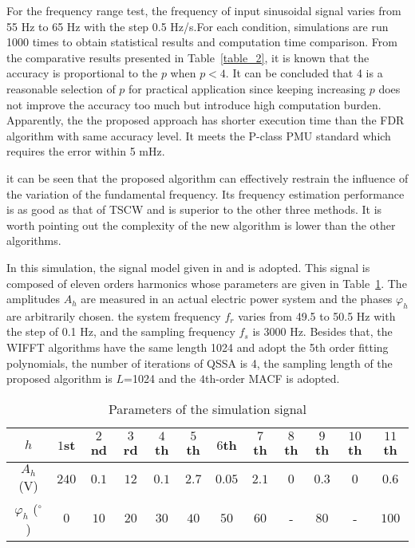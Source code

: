 \documentclass[journal,twoside]{IEEEtran}
\begin{document}
For the frequency range test, the  frequency of  input sinusoidal signal  varies from 55 Hz to 65 Hz with the step 0.5 Hz/s.For each condition, simulations are run 1000 times to obtain statistical results and computation time comparison.      
From the comparative results presented in Table~\ref{table_2},  it is known that the accuracy is proportional to the $p$ when $p<4$. It can be concluded that 4 is a reasonable selection of $p$ for practical application since keeping increasing $p$ does not improve the accuracy too much but introduce high computation burden. 
Apparently, the the proposed approach has shorter execution time than the FDR algorithm with same accuracy level. It meets the P-class PMU standard  which requires the error within 5 mHz.




it can be seen that the proposed algorithm can effectively restrain the influence of the variation of the fundamental frequency. Its frequency estimation performance is as good as that of TSCW and is superior to the other three methods. It is worth pointing out the complexity of the new algorithm is lower than the other algorithms.









In this simulation, the signal model given in \cite{Wen2014} and \cite{Zhang2001} is adopted. This signal is composed of eleven orders harmonics whose parameters are given in Table~\ref{table_1}. The amplitudes $A_h$ are measured in an actual electric power system and the phases $\varphi_h$ are arbitrarily chosen.  the system frequency $f_r$ varies from 49.5 to 50.5 Hz with the step of 0.1 Hz, and the sampling frequency $f_s$ is 3000 Hz. Besides that, the WIFFT algorithms have the same length 1024 and adopt the 5th order fitting polynomials, the number of iterations of QSSA is 4, the sampling length of the proposed algorithm is $L$=1024 and the $4$th-order MACF is adopted.

\begin{table}
	\renewcommand{\arraystretch}{1.3}
	\caption{Parameters of the simulation signal}
	\label{table_1}
	\centering
	\begin{tabular}{@{ }c@{ }@{ }c@{ }@{ }c@{ }@{ }c@{ }@{ }c@{ }@{ }c@{ }@{ }c@{ }@{ }c@{ }@{ }c@{ }@{ }c@{ }@{ }c@{ }@{ }c@{ }}
		\toprule
		$h$ & $1$st & $2$nd & $3$rd & $4$th & $5$th & $6$th & $7$th & $8$th & $9$th & $10$th & $11$th \\
		\midrule
		$A_h$ (V) & $240$ & $0.1$ & $12$ & $0.1$ & $2.7$ & $0.05$ & $2.1$ & $0$ & $0.3$ & $0$ & $0.6$ \\
		$\varphi_h$ ($^\circ$) & $0$ & $10$ & $20$ & $30$ & $40$ & $50$ & $60$ & - & $80$ & - & $100$ \\
		\bottomrule
	\end{tabular}
\end{table}
\end{document}

